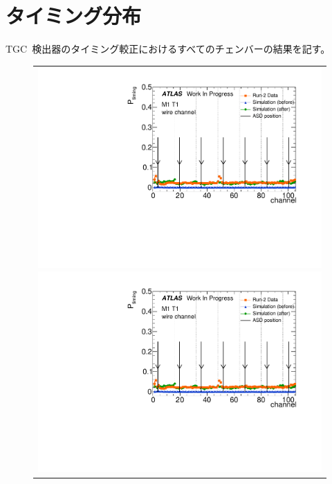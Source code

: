 \renewcommand{\prechaptername}{付録}
\renewcommand{\postchaptername}{}
\renewcommand{\thechapter}{\Alph{chapter}}
\setcounter{chapter}{0}

\chapter{タイミング分布}
\thispagestyle{empty}
\label{app:app1}
TGC~検出器のタイミング較正におけるすべてのチェンバーの結果を記す。

    \begin{figure}[htbp]
		\centering
		\begin{tabular}{l}
			\begin{minipage}{0.22\hsize}
				\includegraphics[width=\textwidth,page=2]{img/pdf5/master_timingplot_comp.pdf}
			\end{minipage}
			
			\begin{minipage}{0.22\hsize}
				\includegraphics[width=\textwidth,page=4]{img/pdf5/master_timingplot_comp.pdf}
			\end{minipage}


\end{tabular}
\end{figure}
